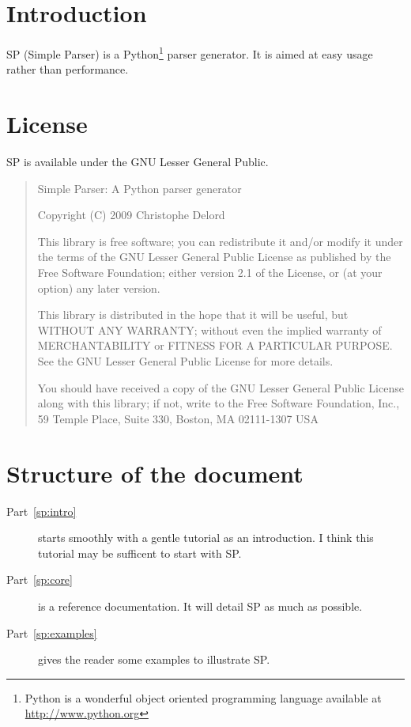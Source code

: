 \section{Introduction}

SP (Simple Parser) is a Python\footnote{Python is a wonderful object oriented programming language available at \url{http://www.python.org}} parser generator.
It is aimed at easy usage rather than performance.

\section{License}

SP is available under the GNU Lesser General Public.

\begin{quote}
Simple Parser: A Python parser generator

Copyright (C) 2009 Christophe Delord
 
This library is free software; you can redistribute it and/or
modify it under the terms of the GNU Lesser General Public
License as published by the Free Software Foundation; either
version 2.1 of the License, or (at your option) any later version.

This library is distributed in the hope that it will be useful,
but WITHOUT ANY WARRANTY; without even the implied warranty of
MERCHANTABILITY or FITNESS FOR A PARTICULAR PURPOSE.  See the GNU
Lesser General Public License for more details.

You should have received a copy of the GNU Lesser General Public
License along with this library; if not, write to the Free Software
Foundation, Inc., 59 Temple Place, Suite 330, Boston, MA  02111-1307  USA 
\end{quote}

\section{Structure of the document}

\begin{description}
\item [Part~\ref{sp:intro}]
starts smoothly with a gentle tutorial as an introduction.
I think this tutorial may be sufficent to start with SP.
\item [Part~\ref{sp:core}]
is a reference documentation. It will detail SP as much as possible.
\item [Part~\ref{sp:examples}]
gives the reader some examples to illustrate SP.
\end{description}
